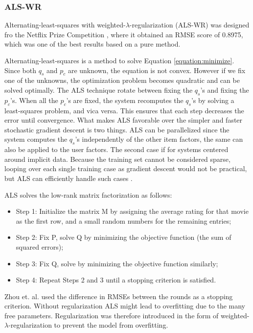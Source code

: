 \subsubsection{ALS-WR}

Alternating-least-squares with weighted-$\lambda$-regularization (ALS-WR) was designed fro the Netflix Prize Competition \cite{Netflix}, where it obtained an RMSE score of 0.8975, which was one of the best results based on a pure method.

Alternating-least-squares is a method to solve Equation \ref{equation:minimize}. Since both $q_{s}$ and $p_{c}$ are unknown, the equation is not convex. However if we fix one of the unknowns, the optimization problem becomes quadratic and can be solved optimally. The ALS technique rotate between fixing the $q_{s}$'s and fixing the $p_{c}$'s. When all the $p_{c}$'s are fixed, the system recomputes the $q_{s}$'s by solving a least-squares problem, and vica versa. This ensures that each step decreases the error until convergence. What makes ALS favorable over the simpler and faster stochastic gradient descent is two things. ALS can be parallelized since the system computes the $q_{s}$'s independently of the other item factors, the same can also be applied to the user factors. The second case if for systems centered around implicit data. Because the training set cannot be considered sparse, looping over each single training case as gradient descent would not be practical, but ALS can efficiently handle such cases \cite{Hu2008}.\newline

ALS solves the low-rank matrix factorization as follows:

\begin{itemize}
\item Step 1: Initialize the matrix M by assigning the average rating for that movie as the first row, and a small random numbers for the remaining entries;
\item Step 2: Fix P, solve Q by minimizing the objective function (the sum of squared errors);
\item Step 3: Fix Q, solve by minimizing the objective function similarly;
\item Step 4: Repeat Steps 2 and 3 until a stopping criterion is satisfied.
\end{itemize}

Zhou et. al. \cite{Zhou2008} used the difference in RMSEs between the rounds as a stopping criterion. Without regularization ALS might lead to overfitting due to the many free parameters. Regularization was therefore introduced in the form of weighted-$\lambda$-regularization to prevent the model from overfitting.

